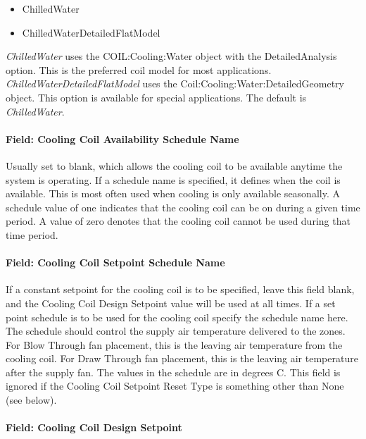 \begin{itemize}
\item
  ChilledWater
\item
  ChilledWaterDetailedFlatModel
\end{itemize}

\emph{ChilledWater} uses the COIL:Cooling:Water object with the DetailedAnalysis option. This is the preferred coil model for most applications. \emph{ChilledWaterDetailedFlatModel} uses the Coil:Cooling:Water:DetailedGeometry object. This option is available for special applications. The default is \emph{ChilledWater}.

\paragraph{Field: Cooling Coil Availability Schedule Name}\label{field-cooling-coil-availability-schedule-name-7}

Usually set to blank, which allows the cooling coil to be available anytime the system is operating. If a schedule name is specified, it defines when the coil is available. This is most often used when cooling is only available seasonally. A schedule value of one indicates that the cooling coil can be on during a given time period. A value of zero denotes that the cooling coil cannot be used during that time period.

\paragraph{Field: Cooling Coil Setpoint Schedule Name}\label{field-cooling-coil-setpoint-schedule-name}

If a constant setpoint for the cooling coil is to be specified, leave this field blank, and the Cooling Coil Design Setpoint value will be used at all times. If a set point schedule is to be used for the cooling coil specify the schedule name here. The schedule should control the supply air temperature delivered to the zones. For Blow Through fan placement, this is the leaving air temperature from the cooling coil. For Draw Through fan placement, this is the leaving air temperature after the supply fan. The values in the schedule are in degrees C. This field is ignored if the Cooling Coil Setpoint Reset Type is something other than None (see below).

\paragraph{Field: Cooling Coil Design Setpoint}\label{field-cooling-coil-design-setpoint-1}

